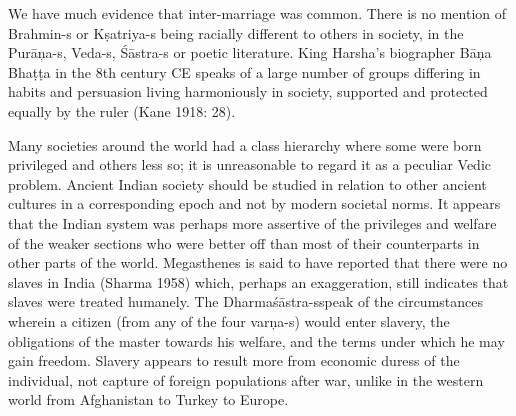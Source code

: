 We have much evidence that inter-marriage was common. There is no mention of Brahmin-s or Kṣatriya-s being racially different to others in society, in the Purāņa-s, Veda-s, Śāstra-s or poetic literature. King Harsha’s biographer Bāņa Bhaṭṭa in the 8th century CE speaks of a large number of groups differing in habits and persuasion living harmoniously in society, supported and protected equally by the ruler (Kane 1918: 28).

Many societies around the world had a class hierarchy where some were born privileged and others less so; it is unreasonable to regard it as a peculiar Vedic problem. Ancient Indian society should be studied in relation to other ancient cultures in a corresponding epoch and not by modern societal norms. It appears that the Indian system was perhaps more assertive of the privileges and welfare of the weaker sections who were better off than most of their counterparts in other parts of the world. Megasthenes is said to have reported that there were no slaves in India (Sharma 1958) which, perhaps an exaggeration, still indicates that slaves were treated humanely. The Dharmaśāstra-s\break speak of the circumstances wherein a citizen (from any of the four varņa-s) would enter slavery, the obligations of the master towards his welfare, and the terms under which he may gain freedom. Slavery appears to result more from economic duress of the individual, not capture of foreign populations after war, unlike in the western world from Afghanistan to Turkey to Europe.

